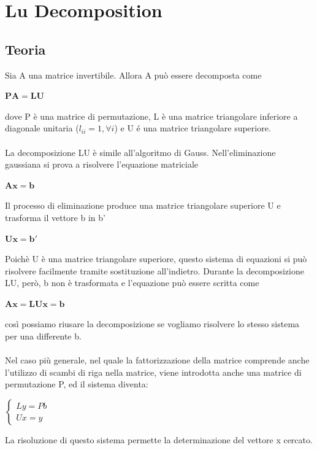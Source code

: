 \documentclass[12pt]{article}
\begin{document}
\maketitle

\section{Lu Decomposition}

\subsection{Teoria}
Sia A una matrice invertibile. Allora A pu\`o essere decomposta come
\begin{center} $\mathbf{PA} = \mathbf{LU}$ \end{center}
dove P \`e una matrice di permutazione, L \`e una matrice triangolare inferiore a diagonale unitaria ($l_{ii} = 1, \forall i$) e U \'e una matrice triangolare superiore. \\\\
La decomposizione LU \`e simile all'algoritmo di Gauss. Nell'eliminazione gaussiana si prova a risolvere l'equazione matriciale
\begin{center} $\mathbf{A} \mathbf{x} = \mathbf{b}$ \end{center}
Il processo di eliminazione produce una matrice triangolare superiore U e trasforma il vettore b in b'
\begin{center} $\mathbf{U} \mathbf{x} = \mathbf{b}'$ \end{center}
Poich\`e U \`e una matrice triangolare superiore, questo sistema di equazioni si pu\`o risolvere facilmente tramite sostituzione all'indietro.
Durante la decomposizione LU, per\`o, b non \`e trasformata e l'equazione pu\`o essere scritta come
\begin{center} $\mathbf{A} \mathbf{x} = \mathbf{L} \mathbf{U} \mathbf{x} = \mathbf{b}$ \end{center}
cos\`i possiamo riusare la decomposizione se vogliamo risolvere lo stesso sistema per una differente b. \\\\
Nel caso pi\`u generale, nel quale la fattorizzazione della matrice comprende anche l'utilizzo di scambi di riga nella matrice, viene introdotta anche una matrice di permutazione P, ed il sistema diventa:
\begin{center} $\left\{ \begin{array}{l} Ly=Pb\\ Ux=y\end{array}\right.$ \end{center}
La risoluzione di questo sistema permette la determinazione del vettore x cercato.
\end{document}
